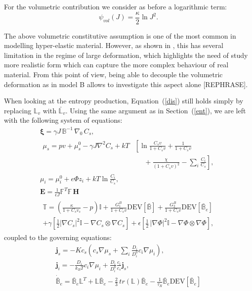 \documentclass[runningheads]{llncs}
\newcommand{\F}{\ensuremath{\mathbb{F}}}
\newcommand{\B}{\ensuremath{\mathbb{B}}}
\newcommand{\LL}{\ensuremath{\mathbb{L}}}
\begin{document}
For the volumetric contribution we consider as before a logarithmic term:
\begin{equation}
\psi_{vol}(J) = \frac{\kappa}{2} \ln J^2.
\end{equation}

The above volumetric constitutive assumption is one of the most common in modelling hyper-elastic material. However, as shown in \cite{vol}, this has several limitation in the regime of large deformation, which highlights the need of study more realistic form which can capture the more complex behaviour of real material. From this point of view, being able to decouple the volumetric deformation as in model B allows to investigate this aspect alone [REPHRASE].

When looking at the entropy production, Equation~(\ref{dis}) still holds simply by replacing $\LL_v$ with $\bar{\LL}_v$. Using the same argument as in Section~(\ref{ent}), we are left with the following system of equations:
\begin{gather}
\boldsymbol{\xi} = \gamma J \,\mathbb{B}^{-1} \,\nabla_0 \,C_s,\label{sys1B}\\[2mm]
\begin{aligned}
\mu_s = p v + \mu_s^0 - \gamma J \nabla^2 C_s + kT&\left[\ln \frac{C_s v}{1+C_s v} + \frac{1}{1+C_sv}\right.\\
&\left.\ \ \ \ \ \ +\frac{\chi}{(1+C_s v)^2}-\sum_i \frac{C_i}{C_s}\right], 
\end{aligned}\\[2.5mm]
\mu_i = \mu^0_i + e\Phi z_i + kT \ln \frac{C_i}{C_s},\\
\mathbf{E} = \frac{1}{\epsilon J} \F^T \F\, \mathbf{H}\, \\[3mm]
\begin{aligned}
\mathbb{T}= \left(\frac{\kappa}{1+C_sv_s}-p\right) \mathbb{I} + \frac{G^B_1}{1+C_sv}\text{DEV}[\bar{\B}] + \frac{G^B_2}{1+C_sv}\text{DEV}[\bar{\B}_e]\\
+ \gamma \left[\frac{1}{2} |\nabla C_s|^2\mathbb{I} - \nabla C_s \otimes \nabla C_s\right]+ \epsilon \left[\frac{1}{2} \,|\nabla \Phi|^2\mathbb{I} -\nabla \Phi \otimes \nabla \Phi\right],\label{sys2B}
\end{aligned}
\end{gather}
coupled to the governing equations:
\begin{gather}
\mathbf{j}_s = -K c_s \left(c_s\nabla \mu_s +\sum_i \frac{D_i}{D^0_i} c_i \nabla \mu_i\right),\\
\mathbf{j}_i = - \frac{D_i}{k_B T}c_i\nabla \mu_i + \frac{D_i}{D^0_i} \frac{c_i}{c_s} \mathbf{j}_s, \\
\dot{\bar{\B}}_e = \bar{\B}_e \LL^T +\LL \bar{\B}_e - \frac{2}{3} \, tr(\LL) \bar{\B}_e -\frac{1}{\tau_R} \bar{\B}_e \text{DEV}\left[\bar{\B}_e\right]
\end{gather}
%
\newpage


%
\end{document}
